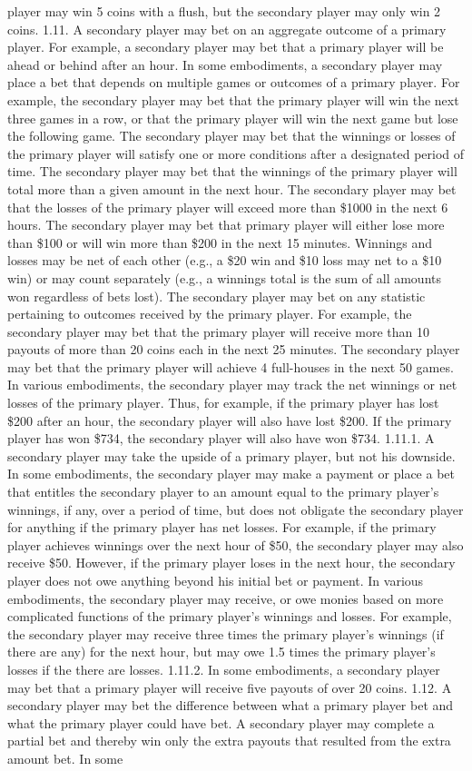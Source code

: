 \documentclass[11pt,a4paper]{article}
\begin{document}
player may win 5 coins with a flush, but the secondary player may only win 2 coins. 1.11. A secondary player may bet on an aggregate outcome of a primary player. For example, a secondary player may bet that a primary player will be ahead or behind after an hour. In some embodiments, a secondary player may place a bet that depends on multiple games or outcomes of a primary player. For example, the secondary player may bet that the primary player will win the next three games in a row, or that the primary player will win the next game but lose the following game. The secondary player may bet that the winnings or losses of the primary player will satisfy one or more conditions after a designated period of time. The secondary player may bet that the winnings of the primary player will total more than a given amount in the next hour. The secondary player may bet that the losses of the primary player will exceed more than \$1000 in the next 6 hours. The secondary player may bet that primary player will either lose more than \$100 or will win more than \$200 in the next 15 minutes. Winnings and losses may be net of each other (e.g., a \$20 win and \$10 loss may net to a \$10 win) or may count separately (e.g., a winnings total is the sum of all amounts won regardless of bets lost). The secondary player may bet on any statistic pertaining to outcomes received by the primary player. For example, the secondary player may bet that the primary player will receive more than 10 payouts of more than 20 coins each in the next 25 minutes. The secondary player may bet that the primary player will achieve 4 full-houses in the next 50 games. In various embodiments, the secondary player may track the net winnings or net losses of the primary player. Thus, for example, if the primary player has lost \$200 after an hour, the secondary player will also have lost \$200. If the primary player has won \$734, the secondary player will also have won \$734. 1.11.1. A secondary player may take the upside of a primary player, but not his downside. In some embodiments, the secondary player may make a payment or place a bet that entitles the secondary player to an amount equal to the primary player's winnings, if any, over a period of time, but does not obligate the secondary player for anything if the primary player has net losses. For example, if the primary player achieves winnings over the next hour of \$50, the secondary player may also receive \$50. However, if the primary player loses in the next hour, the secondary player does not owe anything beyond his initial bet or payment. In various embodiments, the secondary player may receive, or owe monies based on more complicated functions of the primary player's winnings and losses. For example, the secondary player may receive three times the primary player's winnings (if there are any) for the next hour, but may owe 1.5 times the primary player's losses if the there are losses. 1.11.2. In some embodiments, a secondary player may bet that a primary player will receive five payouts of over 20 coins. 1.12. A secondary player may bet the difference between what a primary player bet and what the primary player could have bet. A secondary player may complete a partial bet and thereby win only the extra payouts that resulted from the extra amount bet. In some 
\end{document}
